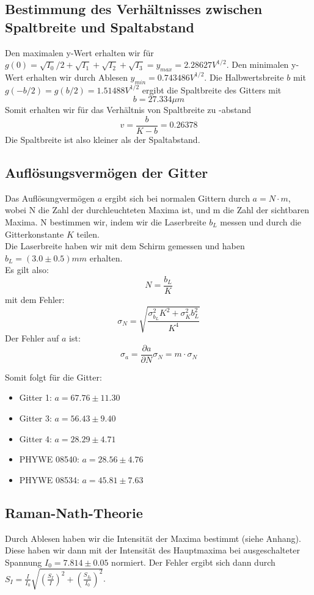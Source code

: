 \subsection{Bestimmung des Verh\"altnisses zwischen Spaltbreite und Spaltabstand}

Den maximalen y-Wert erhalten wir für $g\left( 0 \right) = \sqrt{I_0}/2+\sqrt{I_1}+\sqrt{I_2}+\sqrt{I_3} = y_{max} = 2.28627 V^{1/2} $. Den minimalen y-Wert erhalten wir durch Ablesen $ y_{min} = 0.743486 V^{1/2} $. Die Halbwertsbreite $b$ mit $ g\left( - b/2 \right) = g \left( b/2 \right) = 1.51488 V^{1/2} $ ergibt die Spaltbreite des Gitters mit 
$$ b = 27.334 \mu m $$
Somit erhalten wir für das Verhältnis von Spaltbreite zu -abstand
$$ v = \frac{b}{K-b} = 0.26378 $$ %
Die Spaltbreite ist also kleiner als der Spaltabstand.

\subsection{Aufl\"osungsverm\"ogen der Gitter}

Das Aufl\"osungverm\"ogen $a$ ergibt sich bei normalen Gittern durch $a=N\cdot m$, wobei N die Zahl der durchleuchteten Maxima ist, und m die Zahl der sichtbaren Maxima. N bestimmen wir, indem wir die Laserbreite $b_L$ messen und durch die Gitterkonstante $K$ teilen.\\
Die Laserbreite haben wir mit dem Schirm gemessen und haben $b_L = (3.0 \pm 0.5) mm$ erhalten.\\
Es gilt also: $$N = \frac{b_L}{K}$$
mit dem Fehler: $$\sigma_N = \sqrt{\frac{\sigma_{b_L}^2K^2 + \sigma_K^2b_L^2}{K^4}}$$
Der Fehler auf $a$ ist: $$\sigma_a = \frac{\partial a}{\partial N}\sigma_N = m\cdot \sigma_N$$

Somit folgt f\"ur die Gitter:

\begin{itemize}
\item Gitter 1: $ a = 67.76 \pm 11.30 $
\item Gitter 3: $ a = 56.43 \pm 9.40 $
\item Gitter 4: $ a = 28.29 \pm 4.71 $
\item PHYWE 08540: $ a = 28.56 \pm 4.76 $
\item PHYWE 08534: $ a = 45.81 \pm 7.63 $
\end{itemize}


\subsection{Raman-Nath-Theorie}
Durch Ablesen haben wir die Intensität der Maxima bestimmt (siehe Anhang). Diese haben wir dann mit der Intensität des Hauptmaxima bei ausgeschalteter Spannung $I_0 = 7.814 \pm 0.05$ normiert. Der Fehler ergibt sich dann durch $S_I = \frac{I}{I_0}  \sqrt{\left(\frac{S_I}{I}\right)^2 + \left(\frac{S_{I_0}}{I_0}\right)^2}$.

